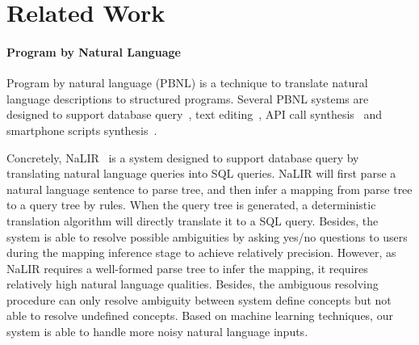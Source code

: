 \section{Related Work}


\paragraph{Program by Natural Language} Program by natural language (PBNL) is a technique to translate natural language descriptions to structured programs. Several PBNL systems are designed to support database query~\cite{DBLP:conf/sigmod/GulwaniM14, DBLP:journals/tods/LiYJ07, DBLP:journals/pvldb/LiJ14}, text editing~\cite{DBLP:journals/corr/DesaiGHJKMRR15}, API call synthesis~\cite{DBLP:journals/corr/RaghothamanWH15} and smartphone scripts synthesis~\cite{DBLP:conf/mobisys/LeGS13}.

Concretely, NaLIR~\cite{DBLP:journals/pvldb/LiJ14} is a system designed to support database query by translating natural language queries into SQL queries. NaLIR will first parse a natural language sentence to parse tree, and then infer a mapping from parse tree to a query tree by rules. When the query tree is generated, a deterministic translation algorithm will directly translate it to a SQL query. Besides, the system is able to resolve possible ambiguities by asking yes/no questions to users during the mapping inference stage to achieve relatively precision. However, as NaLIR requires a well-formed parse tree to infer the mapping, it requires relatively high natural language qualities. Besides, the ambiguous resolving procedure can only resolve ambiguity between system define concepts but not able to resolve undefined concepts. Based on machine learning techniques, our system is able to handle more noisy natural language inputs.

